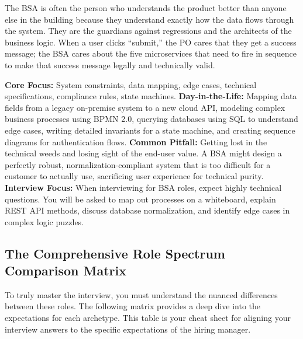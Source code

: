 The BSA is often the person who understands the product better than
anyone else in the building because they understand exactly how the data
flows through the system. They are the guardians against regressions and
the architects of the business logic. When a user clicks ``submit,'' the
PO cares that they get a success message; the BSA cares about the five
microservices that need to fire in sequence to make that success message
legally and technically valid.

\textbf{Core Focus:} System constraints, data mapping, edge cases,
technical specifications, compliance rules, state machines.
\textbf{Day-in-the-Life:} Mapping data fields from a legacy on-premise
system to a new cloud API, modeling complex business processes using
BPMN 2.0, querying databases using SQL to understand edge cases, writing
detailed invariants for a state machine, and creating sequence diagrams
for authentication flows. \textbf{Common Pitfall:} Getting lost in the
technical weeds and losing sight of the end-user value. A BSA might
design a perfectly robust, normalization-compliant system that is too
difficult for a customer to actually use, sacrificing user experience
for technical purity. \textbf{Interview Focus:} When interviewing for
BSA roles, expect highly technical questions. You will be asked to map
out processes on a whiteboard, explain REST API methods, discuss
database normalization, and identify edge cases in complex logic
puzzles.

\subsection{The Comprehensive Role Spectrum Comparison
Matrix}\label{the-comprehensive-role-spectrum-comparison-matrix}

To truly master the interview, you must understand the nuanced
differences between these roles. The following matrix provides a deep
dive into the expectations for each archetype. This table is your cheat
sheet for aligning your interview answers to the specific expectations
of the hiring manager.


